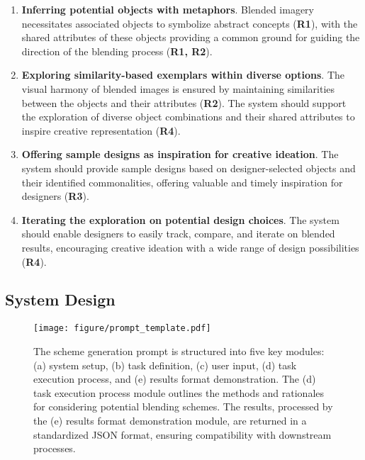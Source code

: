\begin{enumerate}[leftmargin=*, label=\textbf{G\arabic*}]
    \item \textbf{Inferring potential objects with metaphors}. Blended imagery necessitates associated objects to symbolize abstract concepts (\textbf{R1}), with the shared attributes of these objects providing a common ground for guiding the direction of the blending process (\textbf{R1, R2}).
    \item \textbf{Exploring similarity-based exemplars within diverse options}. The visual harmony of blended images is ensured by maintaining similarities between the objects and their attributes (\textbf{R2}). The system should support the exploration of diverse object combinations and their shared attributes to inspire creative representation (\textbf{R4}).
    \item \textbf{Offering sample designs as inspiration for creative ideation}. The system should provide sample designs based on designer-selected objects and their identified commonalities, offering valuable and timely inspiration for designers (\textbf{R3}).
    \item \textbf{Iterating the exploration on potential design choices}. The system should enable designers to easily track, compare, and iterate on blended results, encouraging creative ideation with a wide range of design possibilities (\textbf{R4}).
\end{enumerate}




\subsection{System Design}


\begin{figure*}[t]
  \centering
  \texttt{[image: figure/prompt\_template.pdf]}
  \caption{The scheme generation prompt is structured into five key modules: (a) system setup, (b) task definition, (c) user input, (d) task execution process, and (e) results format demonstration. The (d) task execution process module outlines the methods and rationales for considering potential blending schemes. The results, processed by the (e) results format demonstration module, are returned in a standardized JSON format, ensuring compatibility with downstream processes. 
  }
     \label{fig:prompt-template}
\end{figure*}




